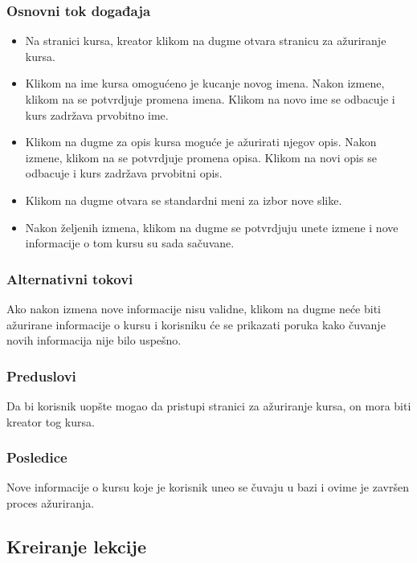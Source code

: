 \subsubsection{Osnovni tok događaja}
\begin{itemize}
  \item Na stranici kursa, kreator klikom na dugme \EditCourseButton{} otvara stranicu za ažuriranje kursa.
  \item Klikom na ime kursa omogućeno je kucanje novog imena. Nakon izmene, klikom na \CheckButton se potvrdjuje promena imena. Klikom na \CrossButton novo ime se odbacuje i kurs zadržava prvobitno ime.
  \item Klikom na dugme \EditCourseButton{} za opis kursa moguće je ažurirati njegov opis. Nakon izmene, klikom na \CheckButton se potvrdjuje promena opisa. Klikom na \CrossButton novi opis se odbacuje i kurs zadržava prvobitni opis.
  \item Klikom na dugme \ChangeAvatarButton{} otvara se standardni meni za izbor nove slike. %
  \item Nakon željenih izmena, klikom na dugme \SaveButton{} se potvrdjuju unete izmene i nove informacije o tom kursu su sada sačuvane.
\end{itemize}
\subsubsection{Alternativni tokovi}
Ako nakon izmena nove informacije nisu validne, klikom na dugme \SaveButton{} neće biti ažurirane informacije o kursu i korisniku će se prikazati poruka kako čuvanje novih informacija nije bilo uspešno.
\subsubsection{Preduslovi}
Da bi korisnik uopšte mogao da pristupi stranici za ažuriranje kursa, on mora biti kreator tog kursa.
\subsubsection{Posledice}
Nove informacije o kursu koje je korisnik uneo se čuvaju u bazi i ovime je završen proces ažuriranja.

\subsection{Kreiranje lekcije}
\label{subsec:kreiranje-lekcije}

